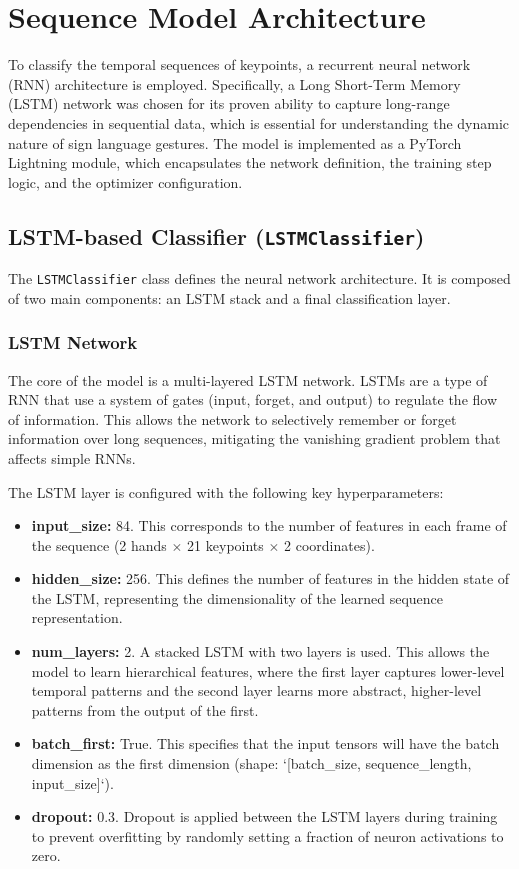 \documentclass[11pt, a4paper]{article}
\begin{document}


\section{Sequence Model Architecture}
To classify the temporal sequences of keypoints, a recurrent neural network (RNN) architecture is employed. Specifically, a Long Short-Term Memory (LSTM) network was chosen for its proven ability to capture long-range dependencies in sequential data, which is essential for understanding the dynamic nature of sign language gestures. The model is implemented as a PyTorch Lightning module, which encapsulates the network definition, the training step logic, and the optimizer configuration.

\subsection{LSTM-based Classifier (\texttt{LSTMClassifier})}
The \texttt{LSTMClassifier} class defines the neural network architecture. It is composed of two main components: an LSTM stack and a final classification layer.

\subsubsection{LSTM Network}
The core of the model is a multi-layered LSTM network. LSTMs are a type of RNN that use a system of gates (input, forget, and output) to regulate the flow of information. This allows the network to selectively remember or forget information over long sequences, mitigating the vanishing gradient problem that affects simple RNNs.

The LSTM layer is configured with the following key hyperparameters:
\begin{itemize}
    \item \textbf{input\_size:} 84. This corresponds to the number of features in each frame of the sequence (2 hands $\times$ 21 keypoints $\times$ 2 coordinates).
    \item \textbf{hidden\_size:} 256. This defines the number of features in the hidden state of the LSTM, representing the dimensionality of the learned sequence representation.
    \item \textbf{num\_layers:} 2. A stacked LSTM with two layers is used. This allows the model to learn hierarchical features, where the first layer captures lower-level temporal patterns and the second layer learns more abstract, higher-level patterns from the output of the first.
    \item \textbf{batch\_first:} True. This specifies that the input tensors will have the batch dimension as the first dimension (shape: `[batch_size, sequence_length, input_size]`).
    \item \textbf{dropout:} 0.3. Dropout is applied between the LSTM layers during training to prevent overfitting by randomly setting a fraction of neuron activations to zero.
\end{itemize}
\end{document}
